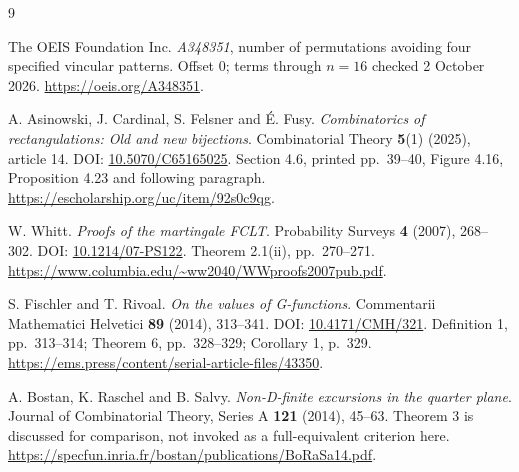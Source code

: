\documentclass[11pt,letterpaper]{article}
\numberwithin{equation}{section}
\begin{document}
\clearpage
\begin{thebibliography}{9}
\raggedright %
The OEIS Foundation Inc.
\emph{A348351}, number of permutations avoiding four specified vincular patterns.
Offset $0$; terms through $n=16$ checked 2 October 2026.
\url{https://oeis.org/A348351}.

A. Asinowski, J. Cardinal, S. Felsner and \'E. Fusy.
\emph{Combinatorics of rectangulations: Old and new bijections}.
Combinatorial Theory \textbf{5}(1) (2025), article 14.
DOI: \href{https://doi.org/10.5070/C65165025}{10.5070/C65165025}.
Section 4.6, printed pp.~39--40, Figure 4.16, Proposition 4.23 and following paragraph.
\url{https://escholarship.org/uc/item/92s0c9qg}.

W. Whitt. \emph{Proofs of the martingale FCLT}.
Probability Surveys \textbf{4} (2007), 268--302.
DOI: \href{https://doi.org/10.1214/07-PS122}{10.1214/07-PS122}.
Theorem 2.1(ii), pp.~270--271.
\url{https://www.columbia.edu/~ww2040/WWproofs2007pub.pdf}.

S. Fischler and T. Rivoal. \emph{On the values of G-functions}.
Commentarii Mathematici Helvetici \textbf{89} (2014), 313--341.
DOI: \href{https://doi.org/10.4171/CMH/321}{10.4171/CMH/321}.
Definition 1, pp.~313--314; Theorem 6, pp.~328--329; Corollary 1, p.~329.
\url{https://ems.press/content/serial-article-files/43350}.

A. Bostan, K. Raschel and B. Salvy.
\emph{Non-D-finite excursions in the quarter plane}.
Journal of Combinatorial Theory, Series A \textbf{121} (2014), 45--63.
Theorem 3 is discussed for comparison, not invoked as a full-equivalent criterion here.
\url{https://specfun.inria.fr/bostan/publications/BoRaSa14.pdf}.
\end{thebibliography}
\end{document}
